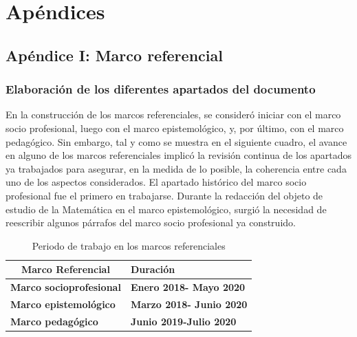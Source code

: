 ﻿
\chapter{Apéndices}

\section{Apéndice I: Marco referencial}


\subsection{Elaboración de los diferentes apartados del documento}

En la construcción de los marcos referenciales, se consideró iniciar con el marco socio profesional, luego con el marco epistemológico, y, por último, con el marco pedagógico. Sin embargo, tal y como se muestra en el siguiente cuadro, el avance en alguno de los marcos referenciales implicó la revisión continua de los apartados ya trabajados para asegurar, en la medida de lo posible, la coherencia entre cada uno de los aspectos considerados. El apartado histórico del marco socio profesional fue el primero en trabajarse. Durante la redacción del objeto de estudio de la Matemática en el marco epistemológico, surgió la necesidad de reescribir algunos párrafos del marco socio profesional ya construido.  

\begin{table}[H]
\begin{center}
\begin{tabular}{|ll|}
\hline
\multicolumn{1}{|c|}{\cellcolor[HTML]{00C0F3} \textbf{Marco Referencial}} &
\multicolumn{1}{l|}{\cellcolor[HTML]{00C0F3} \textbf{Duración}} \\ \hline
\multicolumn{1}{|l|}{\textbf{Marco socioprofesional}} & \multicolumn{1}{l|}{ \textbf{Enero 2018- Mayo 2020}} \\ \hline
\multicolumn{1}{|l|}{\textbf{Marco epistemológico}} & \multicolumn{1}{l|}{ \textbf{Marzo 2018- Junio 2020}} \\ \hline
\multicolumn{1}{|l|}{\textbf{Marco pedagógico}} & \multicolumn{1}{l|}{ \textbf{Junio 2019-Julio 2020}} \\ \hline
\end{tabular}
\end{center}
\caption{Periodo de trabajo en los marcos referenciales}
\end{table}



